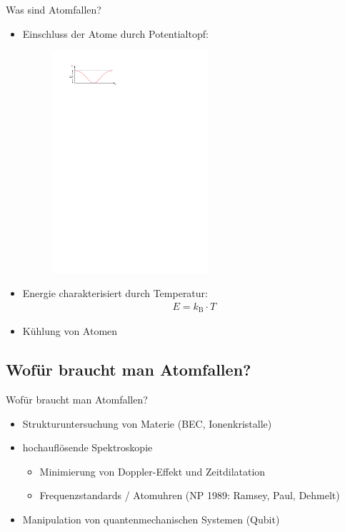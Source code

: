 \documentclass[12pt,xcolor=dvipsnames,professionalfonts]{beamer}
\begin{document}
\begin{frame}{Was sind Atomfallen?}
	\begin{itemize}
		\setlength\itemsep{1em}
		\item Einschluss der Atome durch Potentialtopf:
			\vspace{0.2cm}
			\begin{figure}
				\centering
				\includegraphics[width=0.55\textwidth]{./figures/fallentiefe.pdf}
			\end{figure}
		\item Energie charakterisiert durch Temperatur:
		\begin{align*}
		E = k_\mathrm{B} \cdot T
		\end{align*}
		
		\item Kühlung von Atomen
		
	\end{itemize}

\end{frame}

\subsection{Wofür braucht man Atomfallen?}
\begin{frame}{Wofür braucht man Atomfallen?}
	\begin{itemize}
		\setlength\itemsep{1em}
		\item Strukturuntersuchung von Materie (BEC, Ionenkristalle)
		
		\item hochauflösende Spektroskopie
			\begin{itemize}
				\item Minimierung von Doppler-Effekt und Zeitdilatation
				\item Frequenzstandards / Atomuhren (NP 1989: Ramsey, Paul, Dehmelt)
			\end{itemize}
		
		\item Manipulation von quantenmechanischen Systemen (Qubit)
	\end{itemize}
\end{frame}
\end{document}
